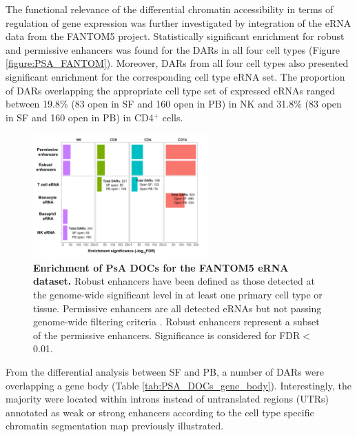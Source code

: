 The functional relevance of the differential chromatin accessibility in terms of regulation of gene expression was further investigated by integration of the eRNA data from the FANTOM5 project. Statistically significant enrichment for robust and permissive enhancers was found for the DARs in all four cell types (Figure \ref{figure:PSA_FANTOM}).  Moreover, DARs from all four cell types also presented significant enrichment for the corresponding cell type eRNA set. The proportion of DARs overlapping the appropriate cell type set of expressed eRNAs ranged between 19.8\% (83 open in SF and 160 open in PB) in NK and 31.8\% (83 open in SF and 160 open in PB) in CD4$^+$ cells.


\begin{figure}[htbp]
\centering
\includegraphics[width=0.6\textwidth]{./Results3/pdfs/ATAC_PsA_FANTOM_enhancer_enrichment_all_cell_types}
\caption[Enrichment of PsA DARs for the FANTOM5 eRNA dataset.]{\textbf{Enrichment of PsA DOCs for the FANTOM5 eRNA dataset.} Robust enhancers have been defined as those detected at the genome-wide significant level in at least one primary cell type or tissue. Permissive enhancers are all detected eRNAs but not passing genome-wide filtering criteria \parencite{Andersson2014}. Robust enhancers represent a subset of the permissive enhancers. Significance is considered for FDR$<$0.01.}
\label{fig:PSA_FANTOM}
\end{figure}

From the differential analysis between SF and PB, a number of DARs were overlapping a gene body (Table \ref{tab:PSA_DOCs_gene_body}). Interestingly, the majority were located within introns instead of untranslated regions (UTRs) annotated as weak or strong enhancers according to the cell type specific chromatin segmentation map previously illustrated. 


